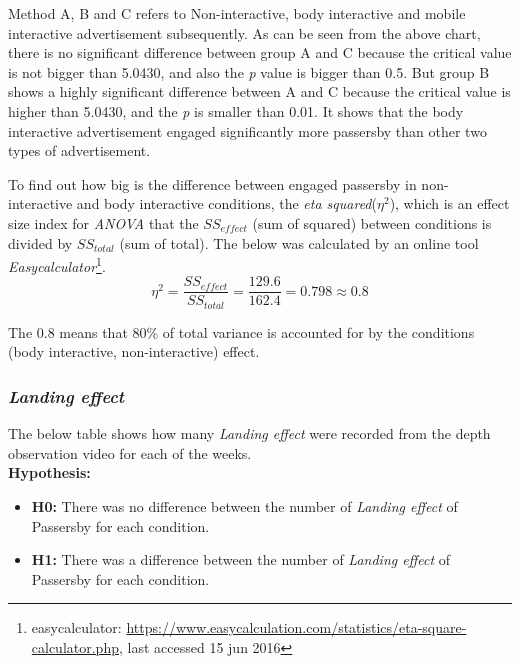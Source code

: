 Method A, B and C refers to Non-interactive, body interactive and mobile interactive advertisement subsequently. As can be seen from the above chart, there is no significant difference between group A and C because the critical value is not bigger than 5.0430, and also the \emph{p} value is bigger than 0.5. But group B shows a highly significant difference between A and C because the critical value is higher than 5.0430, and the \emph{p} is smaller than 0.01. It shows that the body interactive advertisement engaged significantly more passersby than other two types of advertisement.

To find out how big is the difference between engaged passersby in non-interactive and body interactive conditions, the \emph{eta squared}(${\eta}^2$), which is an effect size index for \emph{ANOVA} that the $SS_{effect}$ (sum of squared) between conditions is divided by $SS_{total}$  (sum of total). The below was calculated by an online tool \emph{Easycalculator}\footnote{easycalculator: \url{https://www.easycalculation.com/statistics/eta-square-calculator.php}, last accessed 15 jun 2016}.
\[
{\eta}^2 = \frac{{SS}_{effect}}{{SS}_{total}} = \frac{129.6}{162.4} = 0.798 \approx 0.8
\]

The 0.8 means that 80\% of total variance is accounted for by the conditions (body interactive, non-interactive) effect. 


\subsubsection { \emph{Landing effect}}
The below table shows how many \emph{Landing effect} were recorded from the depth observation video for each of the weeks.\\


\textbf{Hypothesis: }
\begin{itemize}
\item \textbf{H0:} There was no difference between the number of \emph{Landing effect} of Passersby for each condition.
\item \textbf{H1:} There was a difference between the number of \emph{Landing effect} of Passersby for each condition.
\end{itemize}

\begin{table}[H]
\caption{Number of \emph{Landing effect} in three weeks}
\label{tab:landingeffectthreeweeks}
\centering
{}
\end{table}

